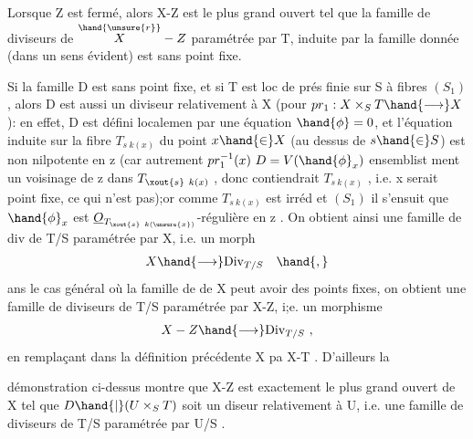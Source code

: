 
 Lorsque Z est fermé, alors X-Z est le plus grand ouvert
tel que la famille de diviseurs de $\overset{\hand{\unsure{r}}}{X}-Z$ paramétrée par T, induite par la
famille donnée (dans un sens évident) est sans point fixe.

Si la famille D est sans point fixe, et si T est  loc de prés finie
sur S à fibres $(S_1)$, alors D est aussi un diviseur 
relativement à X (pour $pr_1 : X\times_S T \hand{\longrightarrow} X$): en effet, D est défini localemen
 par une équation  $\hand{\phi} = 0$, et l'équation induite sur la fibre
$T_{s\ k(x)}$ du point $x\hand{\in} X$ (au dessus de $s\hand{\in} S$) est non 
nilpotente en z (car autrement $pr_1^{-1}(x)\ D = V(\hand{\phi}_x)$   ensemblist
ment un voisinage de z dans $T_{\xout{s}\ k(x)}$ , donc contiendrait $T_{s\ k(x)}$ , i.e.
x serait point fixe, ce qui n'est pas);or comme $T_{s\ k(x)}$ est irréd et $(S_1)$
il s'ensuit que $\hand{\phi}_x$ est $\underline{O}_{T_{\xout{s}\ k(\unsure{x})}}$-régulière en z . On obtient ainsi
 une famille de div de T/S paramétrée par X, i.e. un morph
\[ X \hand{\longrightarrow} \mathrm{Div}_{T/S} \quad \hand{,} \]
ans le cas général où la famille de  de X peut avoir des points
fixes, on obtient une famille de diviseurs de T/S paramétrée par X-Z,
i;e. un morphisme
\[ X - Z \hand{\longrightarrow} \mathrm{Div}_{T/S} \ , \]
en remplaçant dans la définition précédente X pa X-T . D'ailleurs la

 démonstration ci-dessus montre que X-Z est exactement
le plus grand ouvert  de X tel que $D\hand{|}(U\times_S T)$ soit un diseur 
relativement à U, i.e.   une famille de diviseurs de T/S paramétrée
par U/S .

